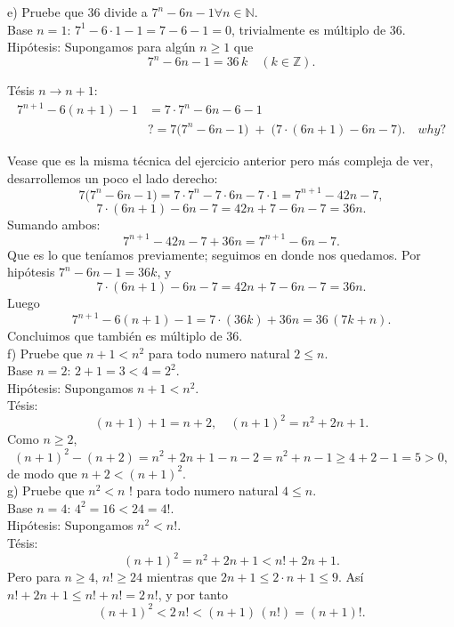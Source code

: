 e) Pruebe que 36 divide a \( 7^{n}-6 n-1 \forall n \in \mathbb{N} \). \\
Base \(n=1\): \(7^{1}-6\cdot1-1=7-6-1=0\), trivialmente es múltiplo de 36. \\

Hipótesis: Supongamos para algún \(n\ge1\) que
\[
     7^{n}-6n-1 = 36\,k \quad(k\in\mathbb Z).
   \]


Tésis \(n\to n+1\):
\begin{align*}
   7^{n+1}-6(n+1)-1
   &=7\cdot7^{n}-6n-6-1 \\
   &?= 7\bigl(7^{n}-6n-1\bigr) \;+\; \bigl(7\cdot(6n+1)-6n-7\bigr). \quad why?
\end{align*}

Vease que es la misma técnica del ejercicio anterior pero más compleja de ver, desarrollemos un poco el lado derecho:
\[
7 \bigl(7^{n} - 6n - 1\bigr) = 7 \cdot 7^{n} - 7 \cdot 6n - 7 \cdot 1 = 7^{n+1} - 42n - 7,
\]
\[
7 \cdot (6n + 1) - 6n - 7 = 42n + 7 - 6n - 7 = 36n.
\]
Sumando ambos:
\[
7^{n+1} - 42n - 7 + 36n = 7^{n+1} - 6n - 7.
\]
Que es lo que teníamos previamente; seguimos en donde nos quedamos. Por hipótesis \(7^{n}-6n-1=36k\), y
\[
     7\cdot(6n+1)-6n-7 = 42n+7-6n-7 =36n.
   \]
Luego
\[
     7^{n+1}-6(n+1)-1
     =7\cdot(36k) +36n =36\,(7k+n).
   \]
Concluimos que también es múltiplo de 36. \\



f) Pruebe que \( n+1<n^{2} \) para todo numero natural \( 2 \leq n \). \\
Base \(n=2\): \(2+1=3<4=2^{2}\). \\
Hipótesis: Supongamos \(n+1<n^{2}\). \\
Tésis:
\[
     (n+1)+1 = n+2,
     \quad
     (n+1)^{2} = n^{2}+2n+1.
   \]
Como \(n\ge2\),
\[
     (n+1)^{2} - (n+2) = n^{2}+2n+1 -n -2 = n^{2}+n-1 \ge 4+2-1=5>0,
   \]
de modo que \(n+2<(n+1)^{2}\).\\

g) Pruebe que \( n^{2}<n \) ! para todo numero natural \( 4 \leq n \). \\
Base \(n=4\): \(4^{2}=16<24=4!\). \\
Hipótesis: Supongamos \(n^{2}<n!\). \\ 
Tésis:
\[
     (n+1)^{2} = n^{2}+2n+1
     < n! + 2n+1.
   \]
Pero para \(n\ge4\), \(n!\ge24\) mientras que \(2n+1\le2\cdot n +1 \le9\).
Así \(n! +2n+1 \le n! +n! =2\,n!\), y por tanto
\[
     (n+1)^{2} <2\,n! < (n+1)\,(n!)
     =(n+1)!.
   \]
   


